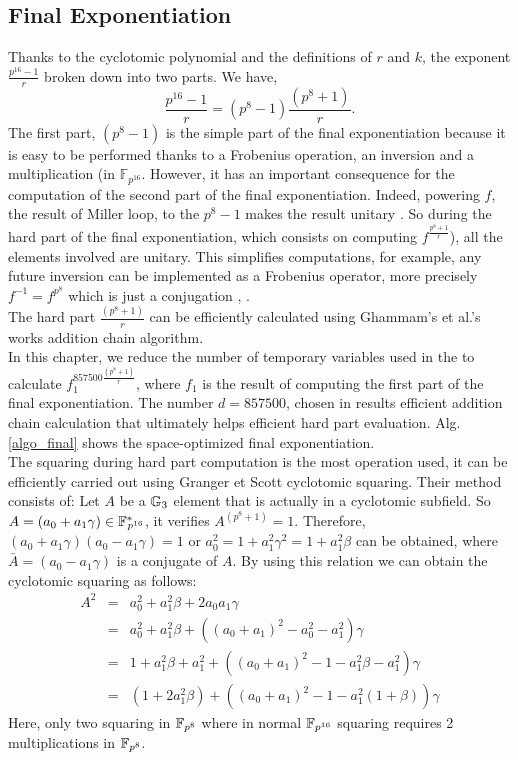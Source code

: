 \subsection{Final Exponentiation}
Thanks to the cyclotomic polynomial and the definitions of $r$ and $k$, the exponent $\frac{p^{16}-1}{r}$  broken down into two parts. We have,
$$\frac{p^{16}-1}{r}=(p^8-1)\frac{(p^8+1)}{r}.$$
The first part, $(p^8-1)$ is the simple part of the final exponentiation
because it is easy to be performed thanks to a Frobenius operation, an inversion and a multiplication (in $\mathbb{F}_{p^{16}}$. 
However, it has an important consequence for the computation of the second part of the final exponentiation. 
Indeed, powering $f$, the result of Miller loop,  to the ${p^8-1}$ makes the result unitary \cite{C:ScoBar04}. So during the hard part of the final exponentiation, which consists on computing $f^{\frac{p^8+1}{r}}$), all the elements involved are unitary.
This  simplifies computations, for example, any future inversion can be implemented as a Frobenius operator, more precisely $f^{-1}=f^{p^8}$ which is just a conjugation \cite{C:ScoBar04}, \cite{CHES:StaLen02}. \\
The hard part $\frac{(p^8+1)}{r}$ can be efficiently calculated using Ghammam's et al.'s works \cite{EPRINT:GhaFou16b} addition chain algorithm.\\
In this chapter, we  reduce the number of temporary variables used in the  \cite{EPRINT:GhaFou16b} to calculate $f_1^{857500{\frac{(p^8+1)}{r}}}$, where   $f_1 $ is the result of computing the first part of the final exponentiation. 
The  number $d=857500$, chosen in  \cite{EPRINT:GhaFou16b}  results efficient addition chain calculation  that ultimately helps efficient hard part evaluation.
Alg. \ref{algo_final}  shows the space-optimized final exponentiation. \\
The squaring during hard part computation is the most operation used, it can be efficiently carried out using Granger et Scott  \cite{PKC:GraSco10} cyclotomic squaring. Their method consists of:
Let $A$ be a ${\mathbb{G}}_{3}$ element that is actually  in a cyclotomic subfield.  So $A = (a_0+a_1\gamma) \in {{\mathbb{F}}^{\ast}}_{\!\!\!p^{16}}$, it verifies $A^{(p^8+1)}=1$. Therefore,  $(a_0+a_1\gamma) (a_0-a_1\gamma)=1$ or $a_0^2=1+a_1^2\gamma^2 =  1+a_1^2\beta$ can be obtained, where  $\bar{A}=(a_0-a_1\gamma)$ is a conjugate of $A$. 
By using this relation we can obtain the cyclotomic squaring as follows:
\begin{eqnarray}
A^2& = &a_0^2+a_1^2 \beta+2a_0a_1\gamma \nonumber \\
&  = & a_0^2+a_1^2 \beta +((a_0+a_1)^2-a_0^2 -a_1^2)  \gamma\nonumber \\
&=& 1+ a_1^2 \beta + a_1^2 + ((a_0+a_1)^2- 1-a_1^2\beta -a_1^2)\gamma \nonumber \\
&=&  (1+ 2a_1^2 \beta)  + ((a_0+a_1)^2- 1-a_1^2(1+\beta) )\gamma \nonumber 
\end{eqnarray}
Here, only two squaring in $\mathbb{F}_{p^{8}}$ where in normal $\mathbb{F}_{p^{16}}$ squaring requires 2 multiplications in $\mathbb{F}_{p^{8}}$.

